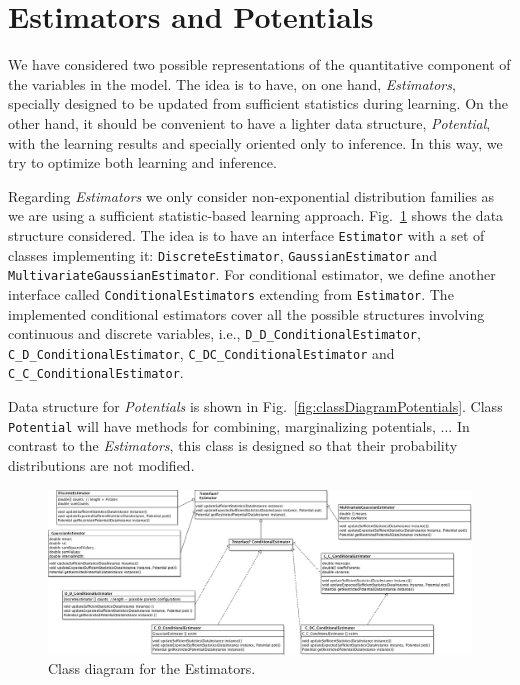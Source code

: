 \documentclass[a4paper,12pt]{article}
\begin{document}
\section{Estimators and Potentials}
\label{sec:estimator_potential}

We have considered two possible representations of the quantitative component of the 
variables in the model. The idea is to have, on one hand, \emph{Estimators}, specially 
designed to be updated from sufficient statistics during learning.
On the other hand, it should be convenient to have a lighter data structure, 
\emph{Potential}, with the learning results and specially oriented only to inference. 
In this way, we try to optimize both learning and inference. 

Regarding \emph{Estimators} we only consider non-exponential distribution families as
we are using a sufficient statistic-based learning approach. Fig.~\ref{fig:classDiagramEstimators}
shows the data structure considered. The idea is to have an interface \texttt{Estimator} with a set 
of classes implementing it: \texttt{DiscreteEstimator}, \texttt{GaussianEstimator} and \texttt{MultivariateGaussianEstimator}.
For conditional estimator, we define another interface called \texttt{ConditionalEstimators} extending from \texttt{Estimator}.
The implemented conditional estimators cover all the possible structures involving continuous and discrete variables, i.e., 
\texttt{D\_D\_ConditionalEstimator}, \texttt{C\_D\_ConditionalEstimator}, \texttt{C\_DC\_ConditionalEstimator} and \texttt{C\_C\_ConditionalEstimator}.

Data structure for \emph{Potentials} is shown in Fig.~\ref{fig:classDiagramPotentials}. Class \texttt{Potential} will have 
methods for combining, marginalizing  potentials, ... In contrast to the \emph{Estimators}, this class is designed so that their 
probability distributions are not modified.

\begin{figure}[h]
\includegraphics[width=\textwidth]{Estimators}
\caption{Class diagram for the Estimators.}
\label{fig:classDiagramEstimators}
\end{figure}
\end{document}

